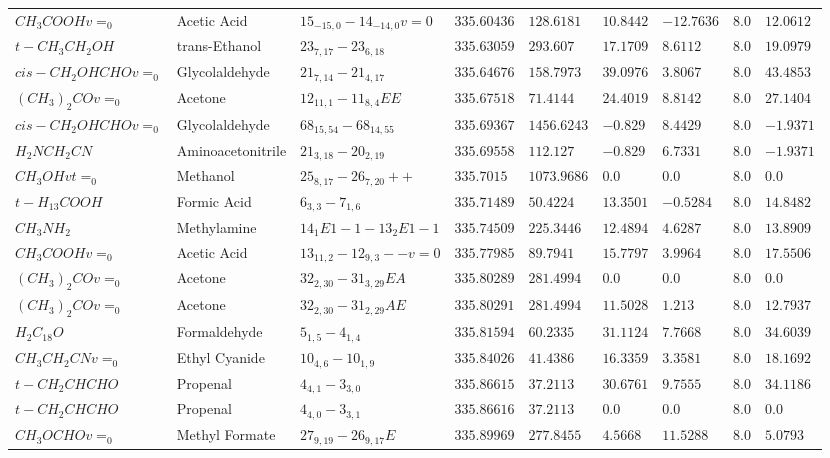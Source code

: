 \documentclass[10pt]{article}
\begin{document}
\begin{landscape}
\begin{table}[htb]
\begin{tabular}{l l l l l l l l l}
$CH_{3}COOHv=_{0}$ & Acetic Acid & $15_{-15,0}-14_{-14,0}v=0$ & $335.60436$ & $128.6181$ & $10.8442$ & $-12.7636$ & $8.0$ & $12.0612$\\
$t-CH_{3}CH_{2}OH$ & trans-Ethanol & $23_{7,17}-23_{6,18}$ & $335.63059$ & $293.607$ & $17.1709$ & $8.6112$ & $8.0$ & $19.0979$\\
$cis-CH_{2}OHCHOv=_{0}$ & Glycolaldehyde & $21_{7,14}-21_{4,17}$ & $335.64676$ & $158.7973$ & $39.0976$ & $3.8067$ & $8.0$ & $43.4853$\\
$(CH_{3})_{2}COv=_{0}$ & Acetone & $12_{11,1}-11_{8,4}EE$ & $335.67518$ & $71.4144$ & $24.4019$ & $8.8142$ & $8.0$ & $27.1404$\\
$cis-CH_{2}OHCHOv=_{0}$ & Glycolaldehyde & $68_{15,54}-68_{14,55}$ & $335.69367$ & $1456.6243$ & $-0.829$ & $8.4429$ & $8.0$ & $-1.9371$\\
$H_{2}NCH_{2}CN$ & Aminoacetonitrile & $21_{3,18}-20_{2,19}$ & $335.69558$ & $112.127$ & $-0.829$ & $6.7331$ & $8.0$ & $-1.9371$\\
$CH_{3}OHvt=_{0}$ & Methanol & $25_{8,17}-26_{7,20}++$ & $335.7015$ & $1073.9686$ & $0.0$ & $0.0$ & $8.0$ & $0.0$\\
$t-H_{13}COOH$ & Formic Acid & $6_{3,3}-7_{1,6}$ & $335.71489$ & $50.4224$ & $13.3501$ & $-0.5284$ & $8.0$ & $14.8482$\\
$CH_{3}NH_{2}$ & Methylamine & $14_{1}E1-1-13_{2}E1-1$ & $335.74509$ & $225.3446$ & $12.4894$ & $4.6287$ & $8.0$ & $13.8909$\\
$CH_{3}COOHv=_{0}$ & Acetic Acid & $13_{11,2}-12_{9,3}--v=0$ & $335.77985$ & $89.7941$ & $15.7797$ & $3.9964$ & $8.0$ & $17.5506$\\
$(CH_{3})_{2}COv=_{0}$ & Acetone & $32_{2,30}-31_{3,29}EA$ & $335.80289$ & $281.4994$ & $0.0$ & $0.0$ & $8.0$ & $0.0$\\
$(CH_{3})_{2}COv=_{0}$ & Acetone & $32_{2,30}-31_{2,29}AE$ & $335.80291$ & $281.4994$ & $11.5028$ & $1.213$ & $8.0$ & $12.7937$\\
$H_{2}C_{18}O$ & Formaldehyde & $5_{1,5}-4_{1,4}$ & $335.81594$ & $60.2335$ & $31.1124$ & $7.7668$ & $8.0$ & $34.6039$\\
$CH_{3}CH_{2}CNv=_{0}$ & Ethyl Cyanide & $10_{4,6}-10_{1,9}$ & $335.84026$ & $41.4386$ & $16.3359$ & $3.3581$ & $8.0$ & $18.1692$\\
$t-CH_{2}CHCHO$ & Propenal & $4_{4,1}-3_{3,0}$ & $335.86615$ & $37.2113$ & $30.6761$ & $9.7555$ & $8.0$ & $34.1186$\\
$t-CH_{2}CHCHO$ & Propenal & $4_{4,0}-3_{3,1}$ & $335.86616$ & $37.2113$ & $0.0$ & $0.0$ & $8.0$ & $0.0$\\
$CH_{3}OCHOv=_{0}$ & Methyl Formate & $27_{9,19}-26_{9,17}E$ & $335.89969$ & $277.8455$ & $4.5668$ & $11.5288$ & $8.0$ & $5.0793$\\
\hline


    \end{tabular}
\end{table}
\end{landscape}
\end{document}
